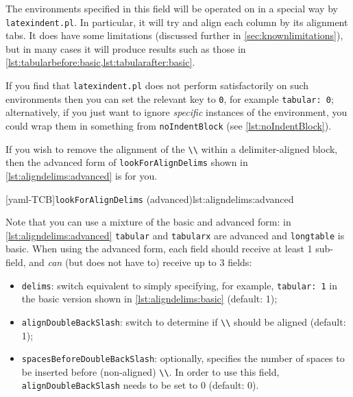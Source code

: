 The environments specified in this field will be operated on in a special way  by \texttt{latexindent.pl}. In particular, it will try and align each column by its alignment
tabs. It does have some limitations (discussed further in \cref{sec:knownlimitations}),
but in many cases it will produce results such as those in \cref{lst:tabularbefore:basic,lst:tabularafter:basic}.

If you find that \texttt{latexindent.pl} does not perform satisfactorily on such
environments then you can set the relevant key to \texttt{0}, for example \texttt{tabular: 0}; alternatively, if you just want to ignore \emph{specific}
instances of the environment, you could wrap them in something from \texttt{noIndentBlock} (see \cref{lst:noIndentBlock}).

\begin{minipage}{.45\textwidth}
\end{minipage}%
\hfill
\begin{minipage}{.45\textwidth}
\end{minipage}%

If you wish to remove the alignment of the \lstinline!\\! within a delimiter-aligned block, then the
advanced form of \texttt{lookForAlignDelims} shown in \cref{lst:aligndelims:advanced} is for you.

[yaml-TCB]{\texttt{lookForAlignDelims} (advanced)}{lst:aligndelims:advanced}

Note that you can use a mixture of the basic and advanced form: in \cref{lst:aligndelims:advanced} \texttt{tabular} and \texttt{tabularx}
are advanced and \texttt{longtable} is basic. When using the advanced form, each field should receive at least 1 sub-field, and \emph{can} (but does not have to) receive up to 3 fields:
\begin{itemize}
	\item \texttt{delims}: switch equivalent to simply specifying, for example, \texttt{tabular: 1} in
	      the basic version shown in \cref{lst:aligndelims:basic} (default: 1);
	\item \texttt{alignDoubleBackSlash}: switch to determine if \lstinline!\\! should be aligned (default: 1);
	\item \texttt{spacesBeforeDoubleBackSlash}: optionally, specifies the number of spaces to be inserted
	      before (non-aligned) \lstinline!\\!. In order to use this field, \texttt{alignDoubleBackSlash} needs
	      to be set to 0 (default: 0).
\end{itemize}

